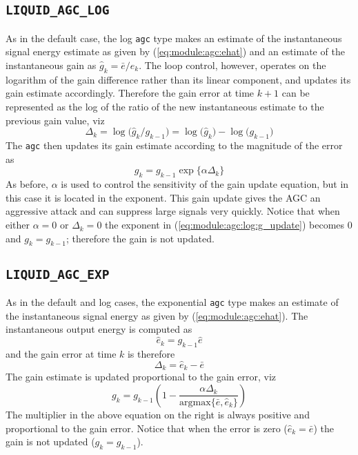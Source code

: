 \subsection{{\tt LIQUID\_AGC\_LOG}}
\label{module:agc:log}
As in the default case, the log {\tt agc} type makes an estimate of the
instantaneous signal energy estimate as given by (\ref{eq:module:agc:ehat})
and an estimate of the instantaneous gain as
$\hat{g}_k = \bar{e} / \hat{e}_k$.
The loop control, however, operates on the logarithm of the gain
difference rather than its linear component, and updates its gain
estimate accordingly.
Therefore the gain error at time $k+1$ can be represented as the log of
the ratio of the new instantaneous estimate to the previous gain value,
viz
%
\begin{equation}
\label{eqn:agc:log:delta}
    \Delta_{k} = \log\bigl( \hat{g}_{k} / g_{k-1} \bigr)
               = \log\bigl( \hat{g}_k \bigr) -
                 \log\bigl( g_{k-1}   \bigr)
\end{equation}
%
The {\tt agc} then updates its gain estimate according to the magnitude
of the error as
%
\begin{equation}
\label{eq:module:agc:log:g_update}
    g_k = g_{k-1} \exp\bigl\{ \alpha \Delta_k \bigr\}
\end{equation}
%
As before, $\alpha$ is used to control the sensitivity of the gain
update equation, but in this case it is located in the exponent.
This gain update gives the AGC an aggressive attack and can suppress
large signals very quickly.
Notice that when either $\alpha=0$ or $\Delta_k=0$
the exponent in (\ref{eq:module:agc:log:g_update})
becomes $0$ and $g_k = g_{k-1}$; therefore the gain is not updated.

\subsection{{\tt LIQUID\_AGC\_EXP}}
\label{module:agc:exp}
As in the default and log cases, the exponential {\tt agc} type makes an
estimate of the instantaneous signal energy as given by
(\ref{eq:module:agc:ehat}).
The instantaneous output energy is computed as
%
\begin{equation}
\label{eqn:agc:exp:eout}
    \hat{e}_{k} = g_{k-1} \hat{e}
\end{equation}
%
and the gain error at time $k$ is therefore
%
\begin{equation}
\label{eqn:agc:exp:delta}
    \Delta_k = \hat{e}_{k} - \bar{e}
\end{equation}
%
The gain estimate is updated proportional to the gain error, viz
%
\begin{equation}
\label{eqn:agc:exp:g}
    g_k =
        g_{k-1} \left(1 -
         \frac{
            \alpha \Delta_k
        }{
            \text{argmax}\bigl\{\bar{e}, \hat{e}_{k} \bigr\}
        }
    \right)
\end{equation}
%
The multiplier in the above equation on the right is always positive and
proportional to the gain error.
Notice that when the error is zero ($\hat{e}_{k} = \bar{e}$) the gain is
not updated ($g_k = g_{k-1}$).


